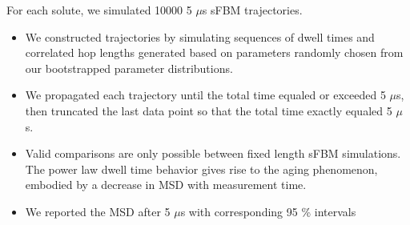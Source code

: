 \documentclass{article}
\begin{document}
  \noindent For each solute, we simulated 10000 5 $\mu$s sFBM trajectories. 
  \begin{itemize}
	\item We constructed trajectories by simulating	sequences of dwell times and correlated 
	hop	lengths generated based on parameters randomly chosen from our bootstrapped parameter
	distributions.
	\item We propagated each trajectory until the total time equaled or exceeded 5 $\mu$s, 
	then truncated the last data point so that the total time exactly equaled 5 $\mu$s. 
    \item Valid comparisons are only possible between fixed length sFBM simulations. The
    power law dwell time behavior gives rise to the aging phenomenon, embodied by
    a decrease in MSD with measurement time.~\cite{neusius_subdiffusion_2008,metzler_anomalous_2014}
    \item We reported the MSD after 5 $\mu$s with corresponding 95 \% intervals
  \end{itemize}
\end{document}
